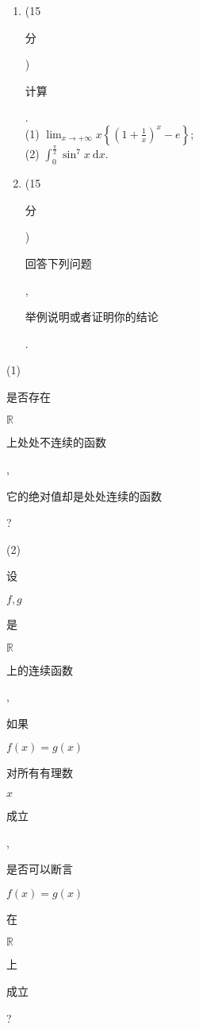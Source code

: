 \documentclass[10pt]{article}
\begin{document}
\begin{enumerate}
  \item (15 \begin{CJK}{UTF8}{mj}分\end{CJK}) \begin{CJK}{UTF8}{mj}计算\end{CJK}.\\
(1) $\lim _{x \rightarrow+\infty} x\left\{\left(1+\frac{1}{x}\right)^{x}-e\right\}$;\\
(2) $\int_{0}^{\frac{\pi}{2}} \sin ^{7} x \mathrm{~d} x$.

  \item (15 \begin{CJK}{UTF8}{mj}分\end{CJK}) \begin{CJK}{UTF8}{mj}回答下列问题\end{CJK}, \begin{CJK}{UTF8}{mj}举例说明或者证明你的结论\end{CJK}.

\end{enumerate}
(1) \begin{CJK}{UTF8}{mj}是否存在\end{CJK} $\mathbb{R}$ \begin{CJK}{UTF8}{mj}上处处不连续的函数\end{CJK}, \begin{CJK}{UTF8}{mj}它的绝对值却是处处连续的函数\end{CJK}?

(2) \begin{CJK}{UTF8}{mj}设\end{CJK} $f, g$ \begin{CJK}{UTF8}{mj}是\end{CJK} $\mathbb{R}$ \begin{CJK}{UTF8}{mj}上的连续函数\end{CJK}, \begin{CJK}{UTF8}{mj}如果\end{CJK} $f(x)=g(x)$ \begin{CJK}{UTF8}{mj}对所有有理数\end{CJK} $x$ \begin{CJK}{UTF8}{mj}成立\end{CJK}, \begin{CJK}{UTF8}{mj}是否可以断言\end{CJK} $f(x)=g(x)$ \begin{CJK}{UTF8}{mj}在\end{CJK} $\mathbb{R}$ \begin{CJK}{UTF8}{mj}上\end{CJK} \begin{CJK}{UTF8}{mj}成立\end{CJK}?
\end{document}

